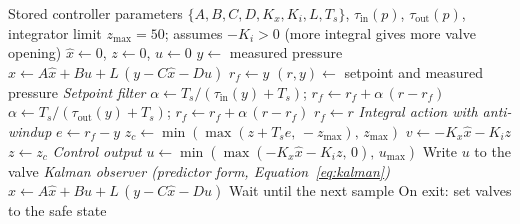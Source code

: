 \documentclass[12pt,a4paper]{article}
\begin{document}
\begin{algorithm}[ht]
\caption{Real-time LQI control on the EQ-DA (every $T_s$)}\label{alg:online}
\begin{algorithmic}[1]
\Require Stored controller parameters $\{A, B, C, D, K_x, K_i, L, T_s\}$, $\tau_{\text{in}}(p)$, $\tau_{\text{out}}(p)$,
         integrator limit $z_{\max} = 50$; assumes $-K_i > 0$ (more integral gives more valve opening)
  \State $\hat{x} \gets 0$, \quad $z \gets 0$, \quad $u \gets 0$
   
    \State $y \gets$ measured pressure
    \State $\hat{x} \gets A\hat{x} + Bu + L\,(y - C\hat{x} - Du)$
  \EndFor
  \State $r_f \gets y$ 
  \Loop
    \State $(r, y) \gets$ setpoint and measured pressure
    \Statex \hspace{\algorithmicindent}\textit{Setpoint filter}
     
      \State $\alpha \gets T_s / (\tau_{\text{in}}(y) + T_s)$; \quad
             $r_f \gets r_f + \alpha\,(r - r_f)$
     
      \State $\alpha \gets T_s / (\tau_{\text{out}}(y) + T_s)$; \quad
             $r_f \gets r_f + \alpha\,(r - r_f)$
    \Else
      \State $r_f \gets r$
    \EndIf
    \Statex \hspace{\algorithmicindent}\textit{Integral action with anti-windup}
    \State $e \gets r_f - y$
    \State $z_c \gets \min(\max(z + T_s e,\, -z_{\max}),\, z_{\max})$
    \State $v \gets -K_x\hat{x} - K_i z$
      \State $z \gets z_c$ 
    \EndIf
    \Statex \hspace{\algorithmicindent}\textit{Control output}
    \State $u \gets \min(\max(-K_x\hat{x} - K_i z,\, 0),\, u_{\max})$
    \State Write $u$ to the valve
    \Statex \hspace{\algorithmicindent}\textit{Kalman observer (predictor form, Equation~\eqref{eq:kalman})}
    \State $\hat{x} \gets A\hat{x} + Bu + L\,(y - C\hat{x} - Du)$ 
    \State Wait until the next sample
  \EndLoop
  \State On exit: set valves to the safe state
\EndProcedure
\end{algorithmic}
\end{algorithm}
\end{document}

